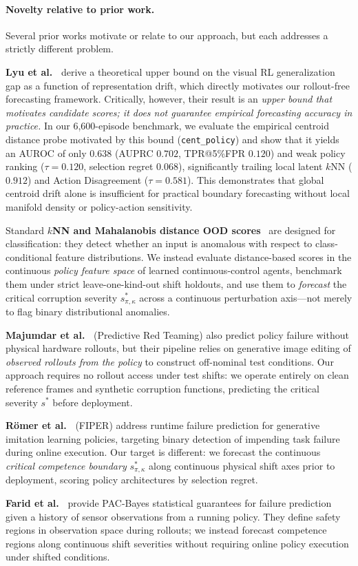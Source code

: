 \paragraph{Novelty relative to prior work.}
Several prior works motivate or relate to our approach, but each addresses a strictly different problem.

\textbf{Lyu et al.~\citep{lyu2024generalization}} derive a theoretical upper bound on the visual RL generalization gap as a function of representation drift, which directly motivates our rollout-free forecasting framework.
Critically, however, their result is an \emph{upper bound that motivates candidate scores; it does not guarantee empirical forecasting accuracy in practice.}
In our 6,600-episode benchmark, we evaluate the empirical centroid distance probe motivated by this bound (\texttt{cent\_policy}) and show that it yields an AUROC of only $0.638$ (AUPRC $0.702$, TPR@5\%FPR $0.120$) and weak policy ranking ($\tau = 0.120$, selection regret $0.068$), significantly trailing local latent $k$NN ($0.912$) and Action Disagreement ($\tau = 0.581$).
This demonstrates that global centroid drift alone is insufficient for practical boundary forecasting without local manifold density or policy-action sensitivity.

Standard \textbf{$k$NN and Mahalanobis distance OOD scores}~\citep{lee2018simple} are designed for classification: they detect whether an input is anomalous with respect to class-conditional feature distributions.
We instead evaluate distance-based scores in the continuous \emph{policy feature space} of learned continuous-control agents, benchmark them under strict leave-one-kind-out shift holdouts, and use them to \emph{forecast} the critical corruption severity $s^*_{\pi, \kappa}$ across a continuous perturbation axis—not merely to flag binary distributional anomalies.

\textbf{Majumdar et al.~\citep{majumdar2025predictive}} (Predictive Red Teaming) also predict policy failure without physical hardware rollouts, but their pipeline relies on generative image editing of \emph{observed rollouts from the policy} to construct off-nominal test conditions.
Our approach requires no rollout access under test shifts: we operate entirely on clean reference frames and synthetic corruption functions, predicting the critical severity $s^*$ before deployment.

\textbf{Römer et al.~\citep{romer2025fiper}} (FIPER) address runtime failure prediction for generative imitation learning policies, targeting binary detection of impending task failure during online execution.
Our target is different: we forecast the continuous \emph{critical competence boundary} $s^*_{\pi, \kappa}$ along continuous physical shift axes prior to deployment, scoring policy architectures by selection regret.

\textbf{Farid et al.~\citep{farid2022failure}} provide PAC-Bayes statistical guarantees for failure prediction given a history of sensor observations from a running policy.
They define safety regions in observation space during rollouts; we instead forecast competence regions along continuous shift severities without requiring online policy execution under shifted conditions.
